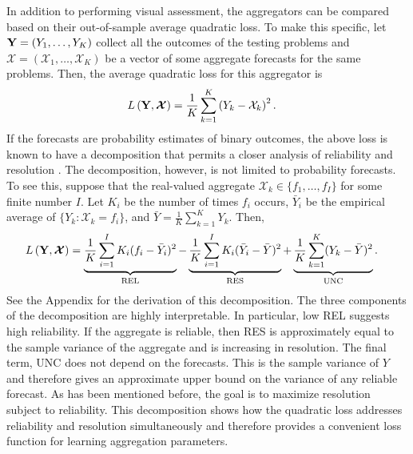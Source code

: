 \documentclass[12pt]{article}
\theoremstyle{definition}
\theoremstyle{definition}
\def\Y{{\bf Y}}
\begin{document}
In addition to performing visual assessment, the aggregators can be compared based on their out-of-sample average quadratic loss. To make this specific, let $\Y = (Y_1, \dots, Y_K)$ collect all the outcomes of the testing problems and $\boldsymbol{\mathcal{X}} = (\mathcal{X}_1, \dots, \mathcal{X}_K)$ be a vector of some aggregate forecasts for the same problems. Then, the average quadratic loss for this aggregator is
\begin{align*}
L\left(\Y, \boldsymbol{\mathcal{X}}\right) &= \frac{1}{K} \sum_{k=1}^K \left(Y_k - \mathcal{X}_k\right)^2.
\end{align*}
If the forecasts are probability estimates of binary outcomes, the above loss is known to have a decomposition that permits a closer analysis of  reliability and resolution \citep{Brier,murphy1973new}. The decomposition, however, is not limited to probability forecasts. To see this, suppose that the real-valued aggregate $\mathcal{X}_k \in \{f_1, \dots, f_I\}$ for some finite number $I$. Let $K_i$ be the number of times $f_i$ occurs, $\bar{Y}_i$ be the empirical average of $\{Y_k : \mathcal{X}_k = f_i\}$, and $\bar{Y} = \frac{1}{K} \sum_{k=1}^K Y_k$. Then,
\begin{align}
L\left(\Y, \boldsymbol{\mathcal{X}} \right)  &= \underbrace{\frac{1}{K} \sum_{i=1}^I K_i(f_i - \bar{Y}_i)^2}_\text{REL} - \underbrace{\frac{1}{K} \sum_{i=1}^I K_i(\bar{Y}_i-\bar{Y})^2}_\text{RES} + \underbrace{\frac{1}{K} \sum_{k=1}^K (Y_k - \bar{Y})^2}_\text{UNC}. \label{decomposition}
\end{align}
See the Appendix for the derivation of this decomposition. The three components of the decomposition are highly interpretable. In particular, low REL suggests high reliability. If the aggregate is reliable, then RES is approximately equal to the sample variance of the aggregate and 
is increasing in resolution.
The final term, UNC does not depend on the forecasts. This is the sample variance of $Y$ and therefore gives an approximate upper bound on the variance of any reliable forecast. As has been mentioned before, the goal is to maximize resolution subject to reliability. This decomposition shows how the quadratic loss addresses reliability and resolution simultaneously and therefore provides a convenient loss function for learning aggregation parameters. 
\end{document}
